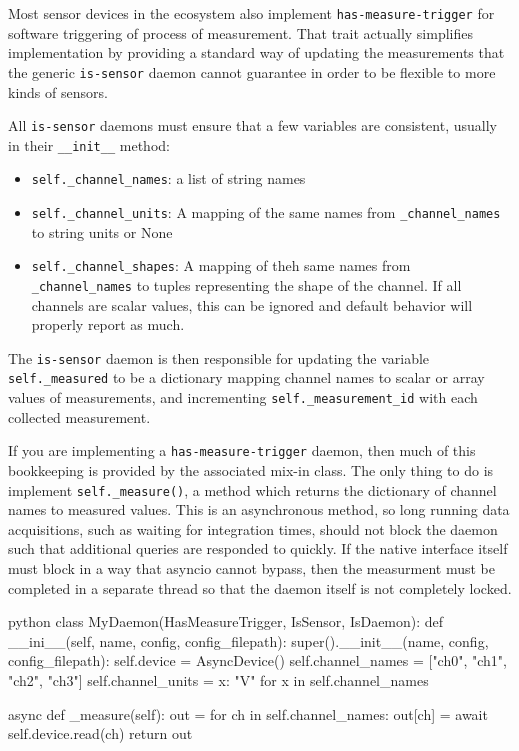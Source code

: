 Most sensor devices in the \yaq{} ecosystem also implement \texttt{has-measure-trigger} for software triggering of process of measurement.
That trait actually simplifies implementation by providing a standard way of updating the measurements that the generic \texttt{is-sensor} daemon cannot guarantee in order to be flexible to more kinds of sensors.

All \texttt{is-sensor} daemons must ensure that a few variables are consistent, usually in their \texttt{\_\_init\_\_} method:

\begin{itemize}
\item \texttt{self.\_channel\_names}: a list of string names
\item \texttt{self.\_channel\_units}: A mapping of the same names from \texttt{\_channel\_names} to string units or None
\item \texttt{self.\_channel\_shapes}: A mapping of theh same names from \texttt{\_channel\_names} to tuples representing the shape of the channel. If all channels are scalar values, this can be ignored and default behavior will properly report as much.
\end{itemize}

The \texttt{is-sensor} daemon is then responsible for updating the variable \texttt{self.\_measured} to be a dictionary mapping channel names to scalar or array values of measurements, and incrementing \texttt{self.\_measurement\_id} with each collected measurement.

If you are implementing a \texttt{has-measure-trigger} daemon, then much of this bookkeeping is provided by the associated mix-in class.
The only thing to do is implement \texttt{self.\_measure()}, a method which returns the dictionary of channel names to measured values.
This is an asynchronous method, so long running data acquisitions, such as waiting for integration times, should not block the daemon such that additional queries are responded to quickly.
If the native interface itself must block in a way that asyncio cannot bypass, then the measurment must be completed in a separate thread so that the daemon itself is not completely locked.

\begin{codefragment}{python}
class MyDaemon(HasMeasureTrigger, IsSensor, IsDaemon):
    def __ini__(self, name, config, config_filepath):
        super().__init__(name, config, config_filepath):
        self.device = AsyncDevice()
        self.channel_names = ["ch0", "ch1", "ch2", "ch3"]
        self.channel_units = {x: "V" for x in self.channel_names}

    async def _measure(self):
        out = {}
        for ch in self.channel_names:
            out[ch] = await self.device.read(ch)
        return out
\end{codefragment}

